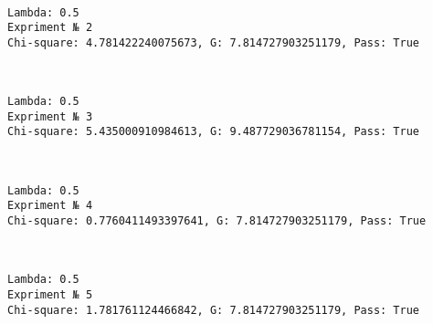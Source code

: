 \documentclass[11pt]{article}
\begin{document}
    \begin{center}
    \end{center}
    { \hspace*{\fill} \\}
    
    \begin{Verbatim}[commandchars=\\\{\}]
Lambda: 0.5
Expriment № 2
Chi-square: 4.781422240075673, G: 7.814727903251179, Pass: True
    \end{Verbatim}

    \begin{center}
    \end{center}
    { \hspace*{\fill} \\}
    
    \begin{Verbatim}[commandchars=\\\{\}]
Lambda: 0.5
Expriment № 3
Chi-square: 5.435000910984613, G: 9.487729036781154, Pass: True
    \end{Verbatim}

    \begin{center}
    \end{center}
    { \hspace*{\fill} \\}
    
    \begin{Verbatim}[commandchars=\\\{\}]
Lambda: 0.5
Expriment № 4
Chi-square: 0.7760411493397641, G: 7.814727903251179, Pass: True
    \end{Verbatim}

    \begin{center}
    \end{center}
    { \hspace*{\fill} \\}
    
    \begin{Verbatim}[commandchars=\\\{\}]
Lambda: 0.5
Expriment № 5
Chi-square: 1.781761124466842, G: 7.814727903251179, Pass: True
    \end{Verbatim}
\end{document}
